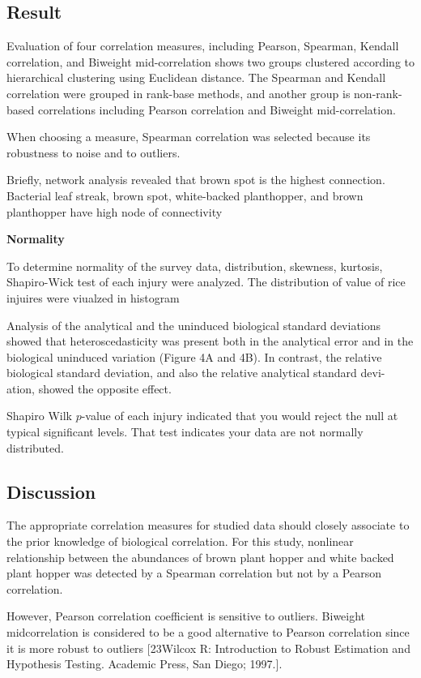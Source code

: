 \subsection{Result}

Evaluation of four correlation measures, including Pearson, Spearman, Kendall correlation, and Biweight mid-correlation shows two groups clustered according to hierarchical clustering using Euclidean distance. The Spearman and Kendall correlation were grouped in rank-base methods, and another group is non-rank-based correlations including Pearson correlation and Biweight mid-correlation. 

When choosing a measure, Spearman correlation was selected because its robustness to noise and to outliers.


Briefly, network analysis revealed that brown spot is the highest connection. Bacterial leaf streak, brown spot, white-backed planthopper, and brown planthopper have high node of connectivity



\textbf{Normality}

To determine normality of the survey data, distribution, skewness, kurtosis, Shapiro-Wick test of each injury were analyzed. The distribution of value of rice injuires were viualzed in histogram

Analysis of the analytical and the uninduced biological standard deviations showed that heteroscedasticity was present both in the analytical error and in the biological uninduced variation (Figure 4A and 4B). In contrast, the relative biological standard deviation, and also the relative analytical standard devi- ation, showed the opposite effect.

Shapiro Wilk $p$-value of each injury indicated that you would reject the null at typical significant levels. That test indicates your data are not normally distributed.


\subsection{Discussion}
The appropriate correlation measures for studied data should closely associate to the prior knowledge of biological correlation. For this study, nonlinear relationship between the abundances of brown plant hopper and white backed plant hopper was detected by a Spearman correlation but not by a Pearson correlation.

However, Pearson correlation coefficient is sensitive to outliers. Biweight midcorrelation is considered to be a good alternative to Pearson correlation since it is more robust to outliers [23Wilcox R: Introduction to Robust Estimation and Hypothesis Testing. Academic Press, San Diego; 1997.].
